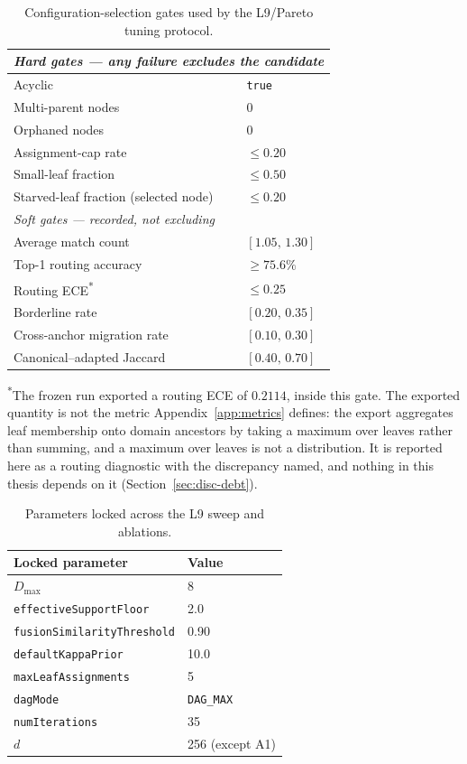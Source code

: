 \begin{table}[h]
\centering
\caption{Configuration-selection gates used by the L9/Pareto tuning protocol.}
\label{tab:pareto-gates}
\begin{tabular}{p{5.4cm}p{3.6cm}}
\toprule
\multicolumn{2}{l}{\textit{Hard gates --- any failure excludes the candidate}} \\
\midrule
Acyclic & \texttt{true} \\
Multi-parent nodes & $0$ \\
Orphaned nodes & $0$ \\
Assignment-cap rate & $\leq 0.20$ \\
Small-leaf fraction & $\leq 0.50$ \\
Starved-leaf fraction (selected node) & $\leq 0.20$ \\
\midrule
\multicolumn{2}{l}{\textit{Soft gates --- recorded, not excluding}} \\
\midrule
Average match count & $[1.05,\,1.30]$ \\
Top-1 routing accuracy & $\geq 75.6\%$ \\
Routing ECE\textsuperscript{*} & $\leq 0.25$ \\
Borderline rate & $[0.20,\,0.35]$ \\
Cross-anchor migration rate & $[0.10,\,0.30]$ \\
Canonical--adapted Jaccard & $[0.40,\,0.70]$ \\
\bottomrule
\end{tabular}
\par\smallskip
\footnotesize \textsuperscript{*}The frozen run exported a routing ECE
of $0.2114$, inside this gate. The exported quantity is not the metric
Appendix~\ref{app:metrics} defines: the export aggregates leaf
membership onto domain ancestors by taking a maximum over leaves rather
than summing, and a maximum over leaves is not a distribution. It is
reported here as a routing diagnostic with the discrepancy named, and
nothing in this thesis depends on it
(Section~\ref{sec:disc-debt}).
\end{table}

\begin{table}[h]
\centering
\caption{Parameters locked across the L9 sweep and ablations.}
\label{tab:tab-locked}
\begin{tabular}{ll}
\toprule
Locked parameter & Value \\
\midrule
$D_{\max}$ & 8 \\
\texttt{effectiveSupportFloor} & 2.0 \\
\texttt{fusionSimilarityThreshold} & 0.90 \\
\texttt{defaultKappaPrior} & 10.0 \\
\texttt{maxLeafAssignments} & 5 \\
\texttt{dagMode} & \texttt{DAG\_MAX} \\
\texttt{numIterations} & 35 \\
$d$ & 256 (except A1) \\
\bottomrule
\end{tabular}
\end{table}

